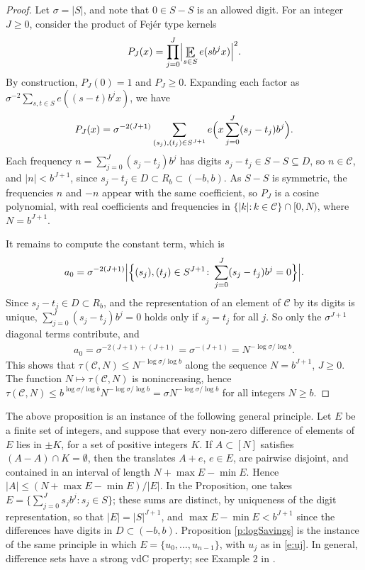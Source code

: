 \begin{proof}
 Let $\sigma=\lvert S\rvert$, and note that $0\in S-S$ is an allowed digit. 
 For an integer $J\geq 0$, consider the product of Fej\'er type kernels 
 \begin{align}
     P_J (x) = \prod _{j=0}^J  \Bigl\lvert \Expectation_{s\in S} e(sb^jx)\Bigr\rvert^2 . 
 \end{align}
By construction, $P_J(0)=1$ and $P_J\geq 0$. 
Expanding each factor as $\sigma^{-2}  \sum_{s,t\in S} e((s-t)b^jx)$, we have 
\begin{align}
    P_J (x) = \sigma^{-2(J+1)} \sum_{ (s_j),(t_j)\in S^{J+1} } e\Bigl( 
    x\sum_{j=0}^J (s_j-t_j) b^j  \Bigr). 
\end{align}
Each frequency $n=\sum_{j=0}^J (s_j-t_j) b^j$ has digits $s_j-t_j\in S-S\subseteq D$, so $n\in\mathcal C$, and $\lvert n\rvert<b^{J+1}$, since $s_j-t_j\in D\subset R_b\subset (-b,b)$. 
As $S-S$ is symmetric, the frequencies $n$ and $-n$ appear with the same coefficient, so $P_J$ is a cosine polynomial, with real coefficients and frequencies in 
$\{\lvert k\rvert\colon k\in\mathcal C\}\cap[0,N)$, where $N=b^{J+1}$. 

It remains to compute the constant term, which is 
\begin{align}
    a_0 = \sigma^{-2(J+1)} \Bigl\lvert \Bigl\{  (s_j),(t_j)\in S^{J+1} \colon  \sum_{j=0}^J (s_j-t_j) b^j =0 \Bigr\}\Bigr\rvert. 
\end{align}
Since $s_j-t_j\in D\subset R_b$, and the representation of an element of $\mathcal C$ by its digits is unique, 
$\sum_{j=0}^J (s_j-t_j) b^j =0$ holds only if $s_j=t_j$ for all $j$. 
So only the $\sigma^{J+1}$ diagonal terms contribute, and 
\begin{align}
    a_0 = \sigma^{-2(J+1) + (J+1)} =\sigma^{-(J+1)}= N^{-\log\sigma/\log b}.   
\end{align}
This shows that $\tau(\mathcal C,N) \leq  N^{-\log\sigma/\log b}$ along the sequence  $N =b^{J+1}$, $J\geq0$. 
The function $N\mapsto \tau(\mathcal C,N)$ is nonincreasing, hence $\tau(\mathcal C,N) \leq b^{\log\sigma/\log b}  N^{-\log\sigma/\log b}=\sigma N^{-\log\sigma/\log b}$ 
for all integers $N\geq b$. 
\end{proof}

The above proposition is an instance of the following general principle. 
Let $E$ be a finite set of integers, and suppose that every non-zero difference of elements of $E$ lies in $\pm K$, for a set of positive integers $K$. 
If $A\subset[N]$ satisfies $(A-A)\cap K=\emptyset$, then the translates $A+e$, $e\in E$, are pairwise disjoint, and contained in an interval of length $N+\max E-\min E$. 
Hence $\lvert A\rvert\leq (N+\max E-\min E)/\lvert E\rvert$. 
In the Proposition, one takes $E=\{\sum_{j=0}^J s_jb^j\colon s_j\in S\}$; these sums are distinct, by uniqueness of the digit representation, so that 
$\lvert E\rvert=\lvert S\rvert^{J+1}$, and $\max E-\min E<b^{J+1}$ since the differences have digits in $D\subset (-b,b)$. 
Proposition \ref{p:logSavings} is the instance of the same principle in which $E=\{u_0,\ldots ,u_{n-1}\}$, with $u_j$ as in \eqref{e:uj}. 
In general, difference sets have a strong vdC property; see Example 2 in \cite{MR0516154}.

